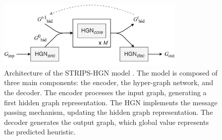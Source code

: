 \begin{figure}[t]
    \centering
    \includegraphics[width=0.8\textwidth]{figures/images/ch4/strips_hgn_architecture.jpg}
    \caption{Architecture of the STRIPS-HGN model \cite{shen2020learning}. The model is composed of three main components: the encoder, the hyper-graph network, and the decoder. The encoder processes the input graph, generating a first hidden graph representation. The HGN implements the message passing mechanism, updating the hidden graph representation. The decoder generates the output graph, which global value represents the predicted heuristic.}
    \label{fig:strips_hgn_architecture}
\end{figure}
